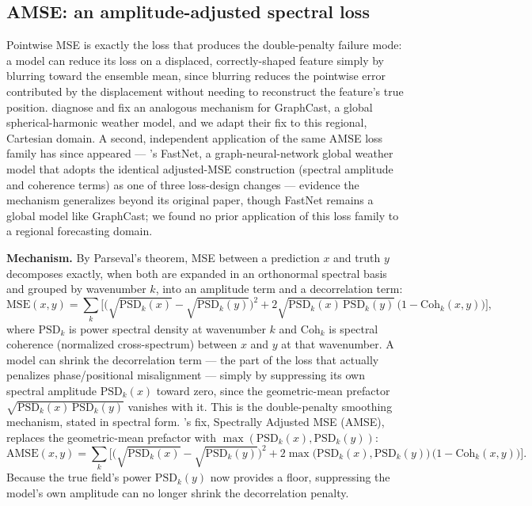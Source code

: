 \documentclass[11pt]{article}
\begin{document}
\subsection{AMSE: an amplitude-adjusted spectral loss}

Pointwise MSE is exactly the loss that produces the double-penalty failure mode: a model can reduce its loss on a displaced, correctly-shaped feature simply by blurring toward the ensemble mean, since blurring reduces the pointwise error contributed by the displacement without needing to reconstruct the feature's true position. \citet{Subich2025} diagnose and fix an analogous mechanism for GraphCast, a global spherical-harmonic weather model, and we adapt their fix to this regional, Cartesian domain. A second, independent application of the same AMSE loss family has since appeared --- \citet{Dunstan2025}'s FastNet, a graph-neural-network global weather model that adopts the identical adjusted-MSE construction (spectral amplitude and coherence terms) as one of three loss-design changes --- evidence the mechanism generalizes beyond its original paper, though FastNet remains a global model like GraphCast; we found no prior application of this loss family to a regional forecasting domain.

\textbf{Mechanism.} By Parseval's theorem, MSE between a prediction $x$ and truth $y$ decomposes exactly, when both are expanded in an orthonormal spectral basis and grouped by wavenumber $k$, into an amplitude term and a decorrelation term:
\begin{equation}
\mathrm{MSE}(x,y) = \sum_k \Big[\big(\sqrt{\mathrm{PSD}_k(x)} - \sqrt{\mathrm{PSD}_k(y)}\big)^2 + 2\sqrt{\mathrm{PSD}_k(x)\,\mathrm{PSD}_k(y)}\,\big(1-\mathrm{Coh}_k(x,y)\big)\Big],
\end{equation}
where $\mathrm{PSD}_k$ is power spectral density at wavenumber $k$ and $\mathrm{Coh}_k$ is spectral coherence (normalized cross-spectrum) between $x$ and $y$ at that wavenumber. A model can shrink the decorrelation term --- the part of the loss that actually penalizes phase/positional misalignment --- simply by suppressing its own spectral amplitude $\mathrm{PSD}_k(x)$ toward zero, since the geometric-mean prefactor $\sqrt{\mathrm{PSD}_k(x)\,\mathrm{PSD}_k(y)}$ vanishes with it. This is the double-penalty smoothing mechanism, stated in spectral form. \citeauthor{Subich2025}'s fix, Spectrally Adjusted MSE (AMSE), replaces the geometric-mean prefactor with $\max(\mathrm{PSD}_k(x), \mathrm{PSD}_k(y))$:
\begin{equation}
\mathrm{AMSE}(x,y) = \sum_k \Big[\big(\sqrt{\mathrm{PSD}_k(x)} - \sqrt{\mathrm{PSD}_k(y)}\big)^2 + 2\max\big(\mathrm{PSD}_k(x), \mathrm{PSD}_k(y)\big)\,\big(1-\mathrm{Coh}_k(x,y)\big)\Big].
\end{equation}
Because the true field's power $\mathrm{PSD}_k(y)$ now provides a floor, suppressing the model's own amplitude can no longer shrink the decorrelation penalty.
\end{document}

